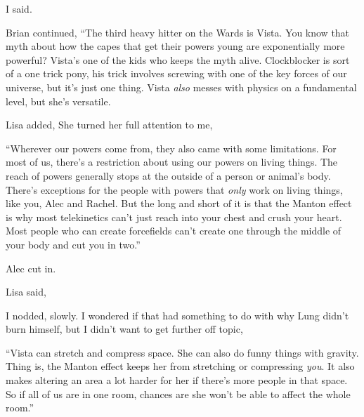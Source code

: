  I said.

Brian continued, “The third heavy hitter on the Wards is Vista. You know that myth about how the capes that get their powers young are exponentially more powerful? Vista's one of the kids who keeps the myth alive. Clockblocker is sort of a one trick pony, his trick involves screwing with one of the key forces of our universe, but it's just one thing. Vista {\em also} messes with physics on a fundamental level, but she's versatile.


 Lisa added,  She turned her full attention to me, 


“Wherever our powers come from, they also came with some limitations. For most of us, there's a restriction about using our powers on living things. The reach of powers generally stops at the outside of a person or animal's body. There's exceptions for the people with powers that {\em only} work on living things, like you, Alec and Rachel. But the long and short of it is that the Manton effect is why most telekinetics can't just reach into your chest and crush your heart. Most people who can create forcefields can't create one through the middle of your body and cut you in two.”

 Alec cut in.

 Lisa said, 

I nodded, slowly. I wondered if that had something to do with why Lung didn't burn himself, but I didn't want to get further off topic, 

“Vista can stretch and compress space. She can also do funny things with gravity. Thing is, the Manton effect keeps her from stretching or compressing {\em you}. It also makes altering an area a lot harder for her if there's more people in that space. So if all of us are in one room, chances are she won't be able to affect the whole room.”

